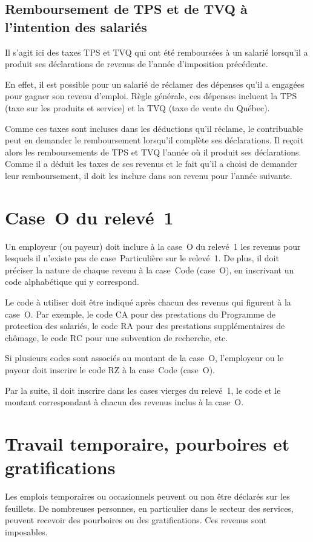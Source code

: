 \subsection{Remboursement de TPS et de TVQ à l'intention des salariés}
Il s'agit ici des taxes TPS et TVQ qui ont été remboursées à un salarié lorsqu'il a produit ses déclarations de revenus de l'année d'imposition précédente. 

En effet, il est possible pour un salarié de réclamer des dépenses qu'il a engagées pour gagner son revenu d'emploi. Règle générale, ces dépenses incluent la TPS (taxe sur les produits et service) et la TVQ (taxe de vente du Québec). 

Comme ces taxes sont incluses dans les déductions qu'il réclame, le contribuable peut en demander le remboursement lorsqu'il complète ses déclarations. Il reçoit alors les remboursements de TPS et TVQ l'année où il produit ses déclarations. Comme il a déduit les taxes de ses revenus et le fait qu'il a choisi de demander leur remboursement, il doit les inclure dans son revenu pour l'année suivante.



\section{Case~O du relevé~1}
Un employeur (ou payeur) doit inclure à la case~O du relevé~1 les revenus pour lesquels il n'existe pas de case~Particulière sur le relevé~1. De plus, il doit préciser la nature de chaque revenu à la case~\og Code (case~O)\fg{}, en inscrivant un code alphabétique qui y correspond. 

Le code à utiliser doit être indiqué après chacun des revenus qui figurent à la
case~O. Par exemple, le code \og CA\fg{} pour des prestations du Programme de protection des salariés, le code \og RA\fg{} pour des prestations supplémentaires de chômage, le code \og RC\fg{} pour une subvention de recherche, etc.

Si plusieurs codes sont associés au montant de la case~O, l'employeur ou le payeur doit inscrire le code \og RZ\fg{} à la case~\og Code (case~O)\fg{}. 

Par la suite, il doit inscrire dans les cases vierges du relevé~1, le code et le montant correspondant à chacun des revenus inclus à la case~O.



\section{Travail temporaire, pourboires et gratifications}
\begin{intro}
	Les emplois temporaires ou occasionnels peuvent ou non être déclarés sur les feuillets. De nombreuses personnes, en particulier dans le secteur des services, peuvent recevoir des pourboires ou des gratifications. Ces revenus sont imposables.
\end{intro}


